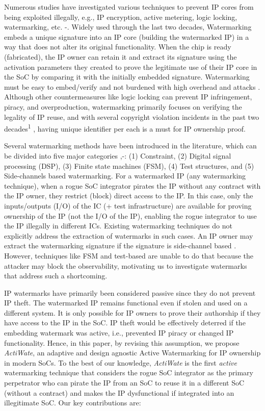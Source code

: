 \documentclass[onecolumn]{IEEEtran}
\begin{document}
Numerous studies have investigated various techniques to prevent
IP cores from being exploited illegally, e.g., IP encryption, active metering, logic locking, watermarking, etc. \cite{b}-\cite{Anandakumar2022}. Widely used through
the last two decades, Watermarking embeds a unique signature into
an IP core (building the watermarked IP) in a way that does not alter
its original functionality. When the chip is ready (fabricated), the
IP owner can retain it and extract its signature using the activation
parameters they created to prove the legitimate use of their IP core
in the SoC by comparing it with the initially embedded signature.
Watermarking must be easy to embed/verify and not burdened with
high overhead and attacks \cite{Chang2016}. Although other countermeasures like
logic locking can prevent IP infringement, piracy, and overproduction,
watermarking primarily focuses on verifying the legality of IP reuse, and with several copyright violation incidents in the past two
decades\textsuperscript{1}
, having unique identifier per each is a must for IP ownership
proof.

Several watermarking methods have been introduced in the literature, which can be divided into five major categories \cite{Anandakumar2022},\cite{Das2022}-\cite{Kibria2022}:
(1) Constraint, (2) Digital signal processing (DSP), (3) Finite state
machines (FSM), (4) Test structures, and (5) Side-channels based
watermarking. For a watermarked IP (any watermarking technique),
when a rogue SoC integrator pirates the IP without any contract with
the IP owner, they restrict (block) direct access to the IP. In this
case, only the inputs/outputs (I/O) of the IC (+ test infrastructure)
are available for proving ownership of the IP (not the I/O of the
IP), enabling the rogue integrator to use the IP illegally in different
ICs. Existing watermarking techniques do not explicitly address the
extraction of watermarks in such cases. An IP owner may extract the
watermarking signature if the signature is side-channel based \cite{Ziener2006}.
However, techniques like FSM and test-based are unable to do that
because the attacker may block the observability, motivating us to
investigate watermarks that address such a shortcoming.

IP watermarks have primarily been considered passive since they
do not prevent IP theft. The watermarked IP remains functional
even if stolen and used on a different system. It is only possible for IP owners to prove their authorship if they have access
to the IP in the SoC. IP theft would be effectively deterred if
the embedding watermark was active, i.e., prevented IP piracy or
changed IP functionality. Hence, in this paper, by revising this
assumption, we propose \textit{ActiWate}, an adaptive and design agnostic
Active Watermarking for IP ownership in modern SoCs. To the best of
our knowledge, \textit{ActiWate} is the first \textit{active} watermarking technique
that considers the rogue SoC integrator as the primary perpetrator
who can pirate the IP from an SoC to reuse it in a different SoC
(without a contract) and makes the IP dysfunctional if integrated into
an illegitimate SoC. Our key contributions are:
\end{document}
